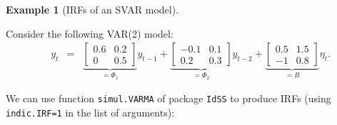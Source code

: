 \documentclass[
  11pt,
]{book}
\theoremstyle{definition}
\theoremstyle{definition}
\newtheorem{example}{Example}[chapter]
\theoremstyle{definition}
\theoremstyle{definition}
\theoremstyle{remark}
\begin{document}
\begin{example}[IRFs of an SVAR model]
\protect\hypertarget{exm:IRFVAR}{}\label{exm:IRFVAR}

Consider the following VAR(2) model:
\begin{eqnarray}
\quad y_t &=&
\underbrace{\left[\begin{array}{cc}
0.6 & 0.2 \\
0 & 0.5
\end{array}\right]}_{=\Phi_1}
y_{t-1} +  
\underbrace{\left[\begin{array}{cc}
-0.1 & 0.1 \\
0.2 & 0.3
\end{array}\right]}_{=\Phi_2}y_{t-2} + \underbrace{\left[\begin{array}{cc}
0.5 & 1.5 \\
-1 & 0.8
\end{array}\right]}_{=B} \eta_{t}.
\label{eq:VAR111}
\end{eqnarray}

We can use function \texttt{simul.VARMA} of package \texttt{IdSS} to produce IRFs (using \texttt{indic.IRF=1} in the list of arguments):


\end{example}
\end{document}
